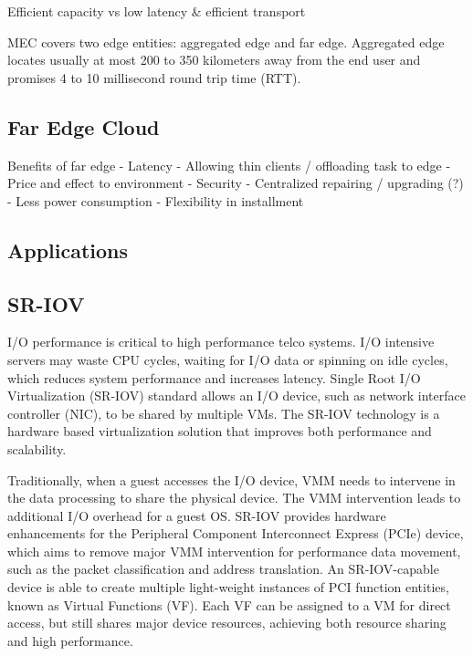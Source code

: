 Efficient capacity vs low latency & efficient transport

MEC covers two edge entities: aggregated edge and far edge. Aggregated edge locates usually at most 200 to 350 kilometers away from the end user and promises 4 to 10 millisecond round trip time (RTT).

\subsection{Far Edge Cloud}

Benefits of far edge
    - Latency
    - Allowing thin clients / offloading task to edge
    - Price and effect to environment
    - Security
    - Centralized repairing / upgrading (?)
    - Less power consumption
    - Flexibility in installment
    



\subsection{Applications}


\subsection{SR-IOV}
\label{section:SR-IOV}

I/O performance is critical to high performance telco systems. I/O intensive servers may waste CPU cycles, waiting for I/O data or spinning on idle cycles, which reduces system performance and increases latency. Single Root I/O Virtualization (SR-IOV) standard allows an I/O device, such as network interface controller (NIC), to be shared by multiple VMs. The SR-IOV technology is a hardware based virtualization solution that improves both performance and scalability. \cite{Dong2012}

Traditionally, when a guest accesses the I/O device, VMM needs to intervene in the data processing to share the physical device. The VMM intervention leads to additional I/O overhead for a guest OS. SR-IOV provides hardware enhancements for the Peripheral Component Interconnect Express (PCIe) device, which aims to remove major VMM intervention for performance data movement, such as the packet classification and address translation. An SR-IOV-capable device is able to create multiple light-weight instances of PCI function entities, known as Virtual Functions (VF). Each VF can be assigned to a VM for direct access, but still shares major device resources, achieving both resource sharing and high performance. \cite{Dong2012}






